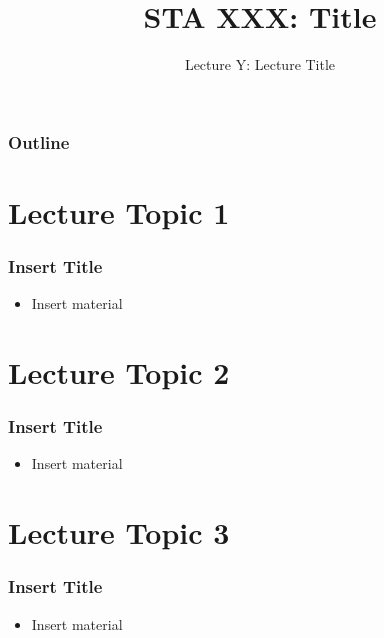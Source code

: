 \documentclass[compress]{beamer}
\title{STA XXX: Title}
\subtitle{Lecture Y: Lecture Title}
\author{}\institute{}
\date{}
\begin{document}

{

\begin{withoutheadline}
	\begin{frame}
        \titlepage
    \end{frame} 
\end{withoutheadline}
} 



{
   \begin{frame}
       \frametitle{Outline}
       \tableofcontents
   \end{frame}
}




\section{Lecture Topic 1}

\begin{frame}
\frametitle{Insert Title}
\begin{itemize}
  \item Insert material
\end{itemize}
\end{frame}

\section{Lecture Topic 2}

\begin{frame}
\frametitle{Insert Title}
\begin{itemize}
  \item Insert material
\end{itemize}
\end{frame}

\section{Lecture Topic 3}

\begin{frame}
\frametitle{Insert Title}
\begin{itemize}
  \item Insert material
\end{itemize}
\end{frame}
\end{document}
